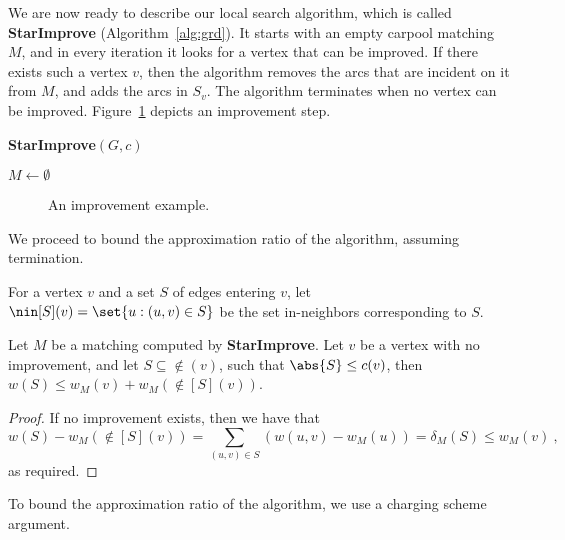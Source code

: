 We are now ready to describe our local search algorithm, which is
called \textbf{StarImprove} (Algorithm~\ref{alg:grd}).  It starts with
an empty carpool matching $M$, and in every iteration it looks for a
vertex that can be improved.  If there exists such a vertex $v$, then
the algorithm removes the arcs that are incident on it from $M$, and
adds the arcs in $S_v$.  The algorithm terminates when no vertex can
be improved.  Figure~\ref{fig:improvement} depicts an improvement
step.

\begin{algorithm}
\caption{\textbf{StarImprove}$(G,c)$}
\label{alg:grd}
$M \gets \emptyset$ \\
\end{algorithm}

\begin{figure}
\caption[]{An improvement example.}
\label{fig:improvement}
\end{figure}

We proceed to bound the approximation ratio of the algorithm, assuming
termination.

For a vertex $v$ and a set $S$ of edges entering $v$, let $\nin[S](v)
= \set{u : (u,v) \in S}$ be the set in-neighbors corresponding to $S$.

\begin{lemma}
\label{lm:no improve}
Let $M$ be a matching computed by \textbf{StarImprove}.  Let $v$ be a
vertex with no improvement, and let $S \subseteq \nin(v)$, such that
$\abs{S} \leq c(v)$, then $w(S) \leq w_M(v) + w_M(\nin[S](v))$.
\end{lemma}
\begin{proof}
If no improvement exists, then we have that 
\[
w(S) - w_M(\nin[S](v))
=    \sum_{(u,v) \in S} (w(u,v) - w_M(u))
=    \delta_M(S) 
\leq w_M(v)
~,
\]
as required.
\end{proof}

To bound the approximation ratio of the algorithm, we use a charging
scheme argument.

